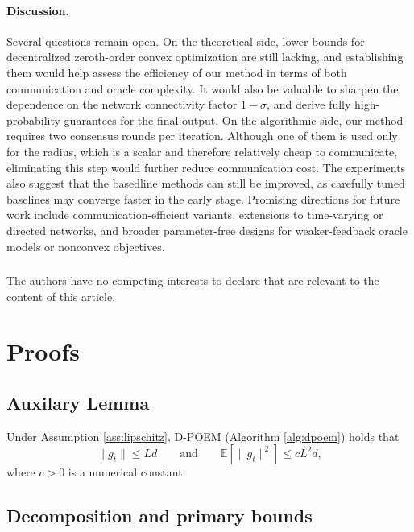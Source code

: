 \documentclass[runningheads]{llncs}
\begin{document}
\paragraph{Discussion.}
Several questions remain open. On the theoretical side, lower bounds 
for decentralized zeroth-order convex optimization are still lacking,
and establishing them would help assess the efficiency of our method
in terms of both communication and oracle complexity. It would also 
be valuable to sharpen the dependence on the network 
connectivity factor $1-\sigma$, and derive fully high-probability 
guarantees for the final output. On the algorithmic side, our 
method requires two consensus rounds per iteration. Although one 
of them is used only for the radius, which is a scalar and 
therefore relatively cheap to communicate, eliminating this 
step would further reduce communication cost. The experiments 
also suggest that the basedline methods can still be improved, as 
carefully tuned baselines may converge faster in the early stage. 
Promising directions for future work include communication-efficient
 variants, extensions to time-varying or directed networks, 
 and broader parameter-free designs for weaker-feedback oracle 
 models or nonconvex objectives.

\begin{credits}
\subsubsection{\discintname}
 The authors have no competing interests to declare that are
relevant to the content of this article. 

\end{credits}

\appendix
\section{Proofs}\label{app:proofs}
\subsection{Auxilary Lemma}
\begin{lemma}\label{eq:norm-grad}
Under Assumption \ref{ass:lipschitz}, D-POEM (Algorithm \ref{alg:dpoem}) holds that
\[
\lVert g_t \rVert \le Ld
\qquad \text{and} \qquad
\mathbb{E}\!\left[\lVert g_t \rVert^2\right] \le cL^2 d,
\]
where \(c>0\) is a numerical constant.
\end{lemma}
\subsection{Decomposition and primary bounds}
\end{document}
